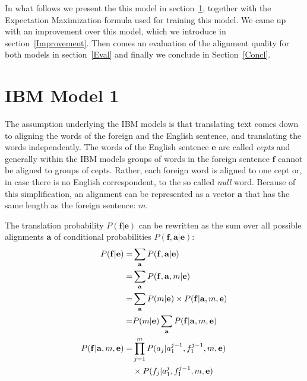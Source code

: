 \documentclass[11pt]{article}
\renewcommand{\vec}[1]{\mathbf{#1}}
\begin{document}
In what follows we present the this model in section~\ref{IBM1}, together with the Expectation Maximization formula used for training this model. We came up with an improvement over this model, which we introduce in section~\ref{Improvement}. Then comes an evaluation of the alignment quality for both models in section~\ref{Eval} and finally we conclude in Section~\ref{Concl}.




\section{IBM Model 1}
\label{IBM1}

The assumption underlying the IBM models is that translating text comes down to aligning the words 
of the foreign and the English sentence, and translating the words independently.
The words of the English sentence $\vec{e}$ are called \textit{cepts} and generally within the IBM models groups of  words in the foreign sentence $\vec{f}$ cannot be aligned to groups of cepts.  Rather, each foreign word  is aligned to one cept or, in case there is no English correspondent, to the so called \textit{null} word.
Because of this simplification, an alignment can be represented as a vector $\vec{a}$ that has the same length as the foreign sentence: $m$.

The translation probability $P(\vec{f}|\vec{e})$ can be rewritten as the sum over all possible alignments $\vec{a}$ of conditional probabilities $P(\vec{f}, \vec{a}|\vec{e})$:
\begin{align}
P(\vec{f}|\vec{e}) =& \sum_\vec{a} P(\vec{f},\vec{a}|\vec{e})\notag\\
=&\sum_\vec{a}  P(\vec{f},\vec{a},m|\vec{e}) \notag\\
=&\sum_\vec{a}  P(m|\vec{e})\times P(\vec{f}|\vec{a},m,\vec{e})\notag\\
=&  P(m|\vec{e}) \sum_\vec{a} P(\vec{f}|\vec{a},m,\vec{e})\\
P(\vec{f}|\vec{a},m,\vec{e})=&\prod_{j=1}^{m} P(a_j|a_1^{j-1}, f_1^{j-1}, m, \vec{e}) \notag \\
& \times  P(f_j|a_1^j,f_1^{j-1},m,\vec{e})\label{p(f|a,m,e)}
\end{align}


\end{document}
